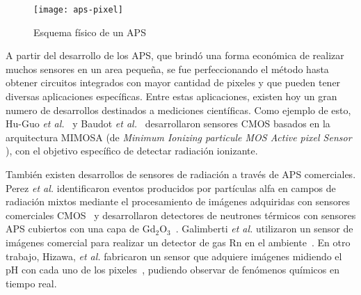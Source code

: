 \begin{figure}[]
	\centering
	\texttt{[image: aps-pixel]}
	\caption{Esquema físico de un APS~\cite{Turchetta2019}}
	\label{fig:pix}
\end{figure}

A partir del desarrollo de los APS, que brindó una forma económica de realizar muchos sensores en un area pequeña, se fue perfeccionando el método hasta obtener circuitos integrados con mayor cantidad de pixeles y que pueden tener diversas aplicaciones específicas. Entre estas aplicaciones, existen hoy un gran numero de desarrollos destinados a mediciones científicas. Como ejemplo de esto, Hu-Guo \textit{et al.}~\cite{Hu-Guo2009} y Baudot \textit{et al.}~\cite{Baudot2009} desarrollaron sensores CMOS basados en la arquitectura MIMOSA (de {\it Minimum Ionizing particule MOS Active pixel Sensor}%
), con el objetivo específico de detectar radiación ionizante.%

También existen desarrollos de sensores de radiación a través de APS comerciales. Perez {\it et al.} identificaron eventos producidos por partículas alfa en campos de radiación mixtos mediante el procesamiento de imágenes adquiridas con sensores comerciales CMOS~\cite{Perez2016} y desarrollaron detectores de neutrones térmicos con sensores APS cubiertos con una capa de Gd$_2$O$_3$~\cite{Perez2018Thermal}. Galimberti {\it et al.} utilizaron un sensor de imágenes comercial para realizar un detector de gas Rn en el ambiente~\cite{Galimberti2018}. En otro trabajo, Hizawa, {\it et al.} fabricaron un sensor que adquiere imágenes midiendo el pH con cada uno de los pixeles~\cite{Hizawa2007}, pudiendo observar de fenómenos químicos en tiempo real.%


